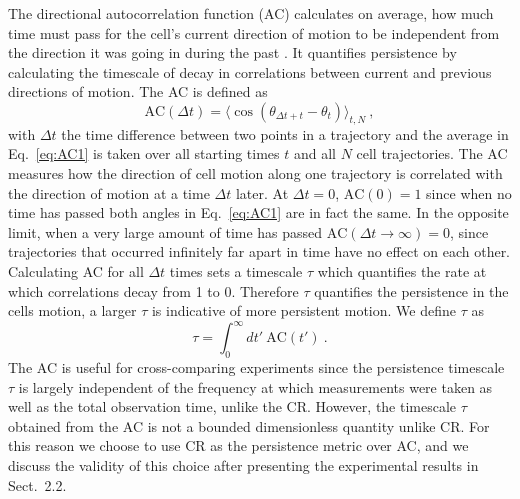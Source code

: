The directional autocorrelation function (AC) calculates on average, how much time must pass for the cell's current direction of motion to be independent from the direction it was going in during the past \cite{gorelik2014quantitative,dang2013inhibitory}.
It quantifies persistence by calculating the timescale of decay in correlations between current and previous directions of motion.
The AC is defined as
\begin{equation} \label{eq:AC1}
    \text{AC}(\Delta t) = \langle \cos(\theta_{\Delta t + t}-\theta_{t}) \rangle_{t,N} \ ,
\end{equation}
with $\Delta t$ the time difference between two points in a trajectory and the average in Eq.\ \ref{eq:AC1} is taken over all starting times $t$ and all $N$ cell trajectories. The AC measures how the direction of cell motion along one trajectory is correlated with the direction of motion at a time $\Delta t$ later.
At $\Delta t = 0$, $\text{AC}(0) = 1$ since when no time has passed both angles in Eq.\ \ref{eq:AC1} are in fact the same. In the opposite limit, when a very large amount of time has passed
$\text{AC}(\Delta t \to \infty) = 0$,
since trajectories that occurred infinitely far apart in time have no effect on each other. Calculating AC for all $\Delta t$ times sets a timescale $\tau$ which quantifies the rate at which correlations decay from 1 to 0. Therefore $\tau$ quantifies the persistence in the cells motion, a larger $\tau$ is indicative of more persistent motion. We define $\tau$ as
\begin{equation} \label{eq:tau1}
    \tau = \int_0^\infty dt' \ \text{AC}(t') \ .
\end{equation}
The AC is useful for cross-comparing experiments since the persistence timescale $\tau$ is largely independent of the frequency at which measurements were taken as well as the total observation time, unlike the CR. However, the timescale $\tau$ obtained from the AC is not a bounded dimensionless quantity unlike CR. For this reason we choose to use CR as the persistence metric over AC, and we discuss the validity of this choice after presenting the experimental results in Sect.\ 2.2.

